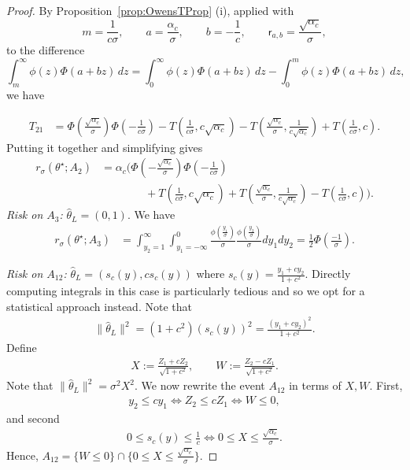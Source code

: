 \documentclass[11pt]{article}
\theoremstyle{plain}
\theoremstyle{definition}
\newcommand{\sfr}{\mathsf{r}}
\newcommand{\hattheta}{\hat{\theta}}
\newcommand{\inparen}[1]{\left(#1\right)}             %
\begin{document}
\begin{proof}
By 
Proposition~\ref{prop:OwensTProp} (i), applied with \[ m=\frac{1}{c\sigma}, \qquad a=\frac{\alpha_c}{\sigma}, \qquad b=-\frac1c, \qquad \sfr_{a,b}=\frac{\sqrt{\alpha_c}}{\sigma}, \] to the difference \[ \int_m^\infty \phi(z)\Phi(a+bz)\,dz = \int_0^\infty \phi(z)\Phi(a+bz)\,dz - \int_0^m \phi(z)\Phi(a+bz)\,dz, \]
we have

\begin{align*}
    T_{21} &=
    \Phi \inparen{\frac{\sqrt{\alpha_c}}{\sigma}}\Phi \inparen{-\frac{1}{c\sigma}}
    -T \inparen{\frac{1}{c\sigma}, c\sqrt{\alpha_c}}
    -T \inparen{\frac{\sqrt{\alpha_c}}{\sigma}, \frac{1}{c\sqrt{\alpha_c}}} 
    + T \inparen{\frac{1}{c\sigma}, c}.
\end{align*}
Putting it together and simplifying gives
\begin{align*}
     r_\sigma(\theta^\star; A_2)
     &=
     \alpha_c \Bigg(
     \Phi \left(-\frac{\sqrt{\alpha_c}}{\sigma}\right)
     \Phi \left(-\frac{1}{c\sigma}\right) \\
     &\qquad\qquad
     + T \left(\frac{1}{c\sigma}, c\sqrt{\alpha_c}\right)
     + T \left(\frac{\sqrt{\alpha_c}}{\sigma},
        \frac{1}{c\sqrt{\alpha_c}}\right)
     - T \left(\frac{1}{c\sigma}, c\right)
     \Bigg).
\end{align*}
    \noindent
\textit{Risk on $A_3$:} $\hattheta_L = (0,1)$. We have 
\begin{align*}
    r_\sigma(\theta^\star; A_3)
    &=
    \int_{y_2=1}^\infty \int_{y_1=-\infty}^0 \frac{\phi\inparen{\frac{y_1}{\sigma}}}{\sigma} \frac{\phi\inparen{\frac{y_2}{\sigma}}}{\sigma} dy_1 dy_2 = \frac{1}{2} \Phi \inparen{\frac{-1}{\sigma}}.
\end{align*}



\noindent
\textit{Risk on $A_{12}$:} $\hattheta_L = (s_c(y), cs_c(y))$ where $s_c(y) = \frac{y_1+cy_2}{1+c^2}$. Directly computing integrals in this case is particularly tedious and so we opt for a statistical approach instead. Note that 
\begin{align*}
    \|\hattheta_L\|^2 = (1+c^2) (s_c(y))^2 = \frac{(y_1 + cy_2)^2}{1+c^2}.
\end{align*}
Define 
\begin{align*}
    X := \frac{Z_1 + cZ_2}{\sqrt{1+c^2}}, 
    \qquad 
    W := \frac{Z_2 - cZ_1}{\sqrt{1+c^2}}.
\end{align*}
Note that $\|\hattheta_L\|^2 = \sigma^2 X^2$. We now rewrite the event $A_{12}$ in terms of $X,W$. First,  
\begin{align*}
    y_2 \le cy_1 \iff Z_2 \le cZ_1 \iff W \le 0,
\end{align*}
and second
\begin{align*}
    0 \le s_c(y) \le \frac1c \iff 0 \le X \le \frac{\sqrt{\alpha_c}}{\sigma}.
\end{align*}
Hence, $A_{12} = \{ W \le 0\} \cap \{ 0 \le X \le  \frac{\sqrt{\alpha_c}}{\sigma} \}$. 


\end{proof}
\end{document}
